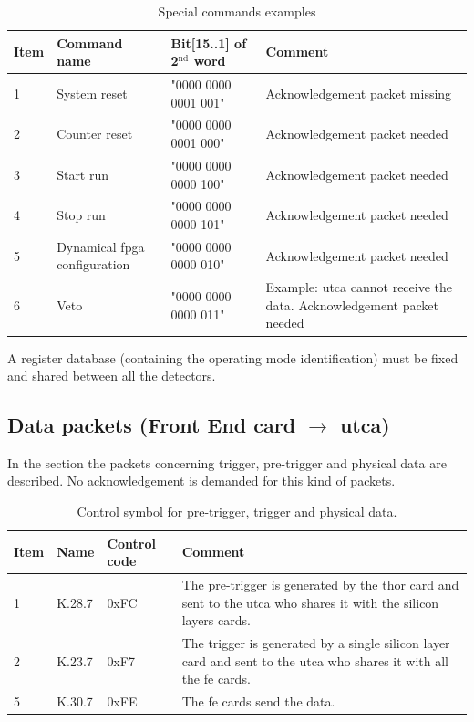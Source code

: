 \begin{table} [!htbp]
\centering
\caption{Special commands examples}
\label{chapappA::tab::specCmdExamples}
\begin{tabular}{m{1.5cm} M{4cm} M{4cm} M{4cm}}
\toprule
{}
\textbf{Item}  			& 	\textbf{Command name}	& \textbf{Bit[15..1] of 2$\mathrm{^{nd}}$ word} & \textbf{Comment} \\
				&	System reset				& "0000 0000 0001  001"  	& Acknowledgement packet missing \\
	2				&	Counter reset			& "0000 0000 0001  000"  	& Acknowledgement packet needed \\
	3				&	Start run					& "0000 0000 0000  100"  	& Acknowledgement packet needed\\
	4				&	Stop run					& "0000 0000 0000  101" 	& Acknowledgement packet needed\\
	5				&	Dynamical \gls{fpga} configuration		& "0000 0000 0000  010" 	& Acknowledgement packet needed\\
	6				&	Veto						& "0000 0000 0000  011" 	& Example: \gls{utca} cannot receive the data. Acknowledgement packet needed\\
\bottomrule
\end{tabular}
\end{table}

A register database (containing the operating mode identification) must be fixed and shared between all the detectors.

\subsection{Data packets (Front End card $\rightarrow$ \gls{utca})}\label{chapappA::subsec::dataPackets}

In the section the packets concerning trigger, pre-trigger and physical data are described.\newline
No acknowledgement is demanded for this kind of packets.

\begin{table} [!htbp]
\centering
\caption{Control symbol for pre-trigger, trigger and physical data.}
\label{chapappA::tab::ctrlSymbolTrigData}
\begin{tabular}{m{1.0cm} M{2cm} M{2cm} M{5cm}}
\toprule
{}
\textbf{Item}  			& 	\textbf{Name}	& \textbf{Control code} & \textbf{Comment} \\
				&	K.28.7	& 0xFC  	& The pre-trigger is generated by the \gls{thor} card and sent to the \gls{utca} who shares it with the silicon layers cards. \\
	2				&	K.23.7	& 0xF7  	& The trigger is generated by a single silicon layer card and sent to the \gls{utca} who shares it with all the \gls{fe} cards.\\

	5				&	K.30.7	& 0xFE	& The \gls{fe} cards send the data.  \\
\bottomrule
\end{tabular}
\end{table}

